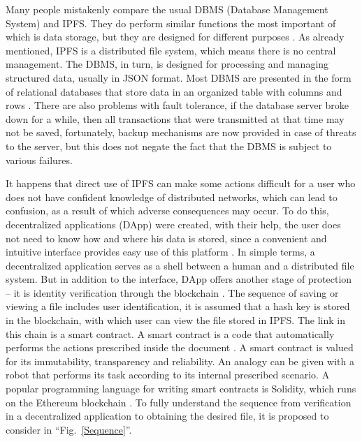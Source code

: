 \documentclass[10pt,conference,a4paper]{IEEEtran_EDM}
\begin{document}
Many people mistakenly compare the usual DBMS (Database Management System) and IPFS.
They do perform similar functions the most important of which is data storage, but they are designed for different purposes \cite{Ruan}.
As already mentioned, IPFS is a distributed file system, which means there is no central management.
The DBMS, in turn, is designed for processing and managing structured data, usually in JSON format.
Most DBMS are presented in the form of relational databases that store data in an organized table with columns and rows \cite{Gillenson}.
There are also problems with fault tolerance, if the database server broke down for a while, then all transactions that were transmitted at that time may not be saved, fortunately, backup mechanisms are now provided in case of threats to the server, but this does not negate the fact that the DBMS is subject to various failures.

It happens that direct use of IPFS can make some actions difficult for a user who does not have confident knowledge of distributed networks, which can lead to confusion, as a result of which adverse consequences may occur.
To do this, decentralized applications (DApp) were created, with their help, the user does not need to know how and where his data is stored, since a convenient and intuitive interface provides easy use of this platform \cite{Infante}.
In simple terms, a decentralized application serves as a shell between a human and a distributed file system.
But in addition to the interface, DApp offers another stage of protection – it is identity verification through the blockchain \cite{Lin}.
The sequence of saving or viewing a file includes user identification, it is assumed that a hash key is stored in the blockchain, with which user can view the file stored in IPFS.
The link in this chain is a smart contract.
A smart contract is a code that automatically performs the actions prescribed inside the document \cite{Frolov}.
A smart contract is valued for its immutability, transparency and reliability.
An analogy can be given with a robot that performs its task according to its internal prescribed scenario.
A popular programming language for writing smart contracts is Solidity, which runs on the Ethereum blockchain \cite{Khan Nabeel}.
To fully understand the sequence from verification in a decentralized application to obtaining the desired file, it is proposed to consider in ``Fig.~\ref{Sequence}''.
\end{document}
